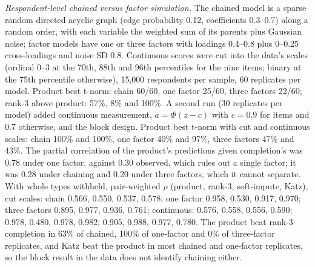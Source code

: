 \documentclass[journal]{IEEEtran}
\begin{document}
\emph{Respondent-level chained versus factor simulation.} The chained model is a sparse random directed acyclic graph (edge probability 0.12, coefficients 0.3--0.7) along a random order, with each variable the weighted sum of its parents plus Gaussian noise; factor models have one or three factors with loadings 0.4--0.8 plus 0--0.25 cross-loadings and noise SD 0.8. Continuous scores were cut into the data's scales (ordinal 0--3 at the 70th, 88th and 96th percentiles for the nine items; binary at the 75th percentile otherwise), 15,000 respondents per sample, 60 replicates per model. Product best t-norm: chain 60/60, one factor 25/60, three factors 22/60; rank-3 above product: 57\%, 8\% and 100\%. A second run (30 replicates per model) added continuous measurement, $a=\Phi(z-c)$ with $c=0.9$ for items and 0.7 otherwise, and the block design. Product best t-norm with cut and continuous scales: chain 100\% and 100\%, one factor 40\% and 97\%, three factors 47\% and 43\%. The partial correlation of the product's predictions given completion's was 0.78 under one factor, against 0.30 observed, which rules out a single factor; it was 0.28 under chaining and 0.20 under three factors, which it cannot separate. With whole types withheld, pair-weighted $\rho$ (product, rank-3, soft-impute, Katz), cut scales: chain 0.566, 0.550, 0.537, 0.578; one factor 0.958, 0.530, 0.917, 0.970; three factors 0.895, 0.977, 0.936, 0.761; continuous: 0.576, 0.558, 0.556, 0.590; 0.978, 0.480, 0.978, 0.982; 0.905, 0.988, 0.977, 0.780. The product beat rank-3 completion in 63\% of chained, 100\% of one-factor and 0\% of three-factor replicates, and Katz beat the product in most chained and one-factor replicates, so the block result in the data does not identify chaining either.
\end{document}
